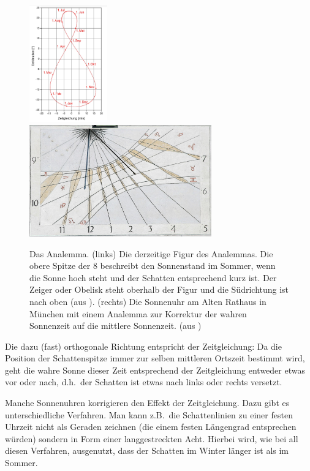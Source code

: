 \begin{figure}[htb]
\includegraphics[width=0.3\textwidth]{./Bilder/Analemma.jpg} 
\hfill
\includegraphics[width=0.7\textwidth]{./Bilder/Munich_Altes_Rathaus_Sundial.jpg}
\caption{\label{fig_Analemma}%
Das Analemma. (links) Die derzeitige Figur des Analemmas. Die obere Spitze der 8
beschreibt den Sonnenstand im Sommer, wenn die Sonne hoch steht und der Schatten
entsprechend kurz ist. Der Zeiger oder Obelisk steht oberhalb der Figur und die S\"udrichtung
ist nach oben (aus \cite{Wikipedia_Analemma}). (rechts) Die Sonnenuhr am Alten Rathaus in M\"unchen
mit einem Analemma zur 
Korrektur der wahren Sonnenzeit auf die mittlere Sonnenzeit. (aus \cite{Niermann})} 
\end{figure}

Die dazu (fast) orthogonale Richtung entspricht der Zeitgleichung: Da die Position der Schattenspitze
immer zur selben mittleren Ortszeit bestimmt wird, geht die wahre Sonne dieser Zeit entsprechend
der Zeitgleichung entweder etwas vor oder nach, d.h.\ der Schatten ist etwas nach links oder
rechts versetzt. 

Manche Sonnenuhren korrigieren den Effekt der Zeitgleichung. Dazu gibt es unterschiedliche
Verfahren. Man kann z.B.\ die Schattenlinien zu einer festen Uhrzeit nicht als Geraden zeichnen
(die einem festen L\"angengrad entsprechen w\"urden) sondern in Form einer langgestreckten
Acht. Hierbei wird, wie bei all diesen Verfahren, ausgenutzt, dass der Schatten im Winter l\"anger
ist als im Sommer. 

